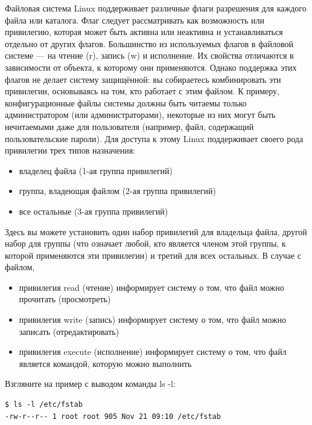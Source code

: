 \documentclass[10pt]{book}
\begin{document}
Файловая система Linux поддерживает различные флаги разрешения для каждого файла или каталога. Флаг следует рассматривать как возможность или привилегию, которая может быть активна или неактивна и устанавливаться отдельно от других флагов. Большинство из используемых флагов в файловой системе —  на чтение (r), запись (w) и исполнение. Их свойства отличаются в зависимости от объекта, к которому они применяются.
Однако поддержка этих флагов не делает систему защищённой: вы собираетесь комбинировать эти привилегии, основываясь на том, кто работает с этим файлом. К примеру, конфигурационные файлы системы должны быть читаемы только администратором (или администраторами), некоторые из них могут быть нечитаемыми даже для пользователя (например, файл, содержащий пользовательские пароли).
Для доступа к этому Linux поддерживает своего рода привилегии трех типов назначения:

\begin{itemize}
\item владелец файла (1-ая группа привилегий)
\item группа, владеющая файлом (2-ая группа привилегий)
\item все остальные (3-ая группа привилегий)
\end{itemize}

Здесь вы можете установить один набор привилегий для владельца файла, другой набор для группы (что означает любой, кто является членом этой группы, к которой применяются эти привилегии) и третий для всех остальных.
В случае с файлом,

\begin{itemize}
\item привилегия read (чтение) информирует систему о том, что файл можно прочитать (просмотреть)
\item привилегия write (запись) информирует систему о том, что файл можно записать (отредактировать)
\item привилегия execute (исполнение) информирует систему о том, что файл является командой, которую можно выполнить
\end{itemize}

Взгляните на пример с выводом команды ls -l:

\vspace{3mm}
\begin{tcolorbox}
\begin{lstlisting}
$ ls -l /etc/fstab
-rw-r--r-- 1 root root 905 Nov 21 09:10 /etc/fstab
\end{lstlisting}
\end{tcolorbox}
\end{document}
